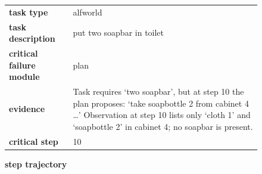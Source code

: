 \documentclass[../../main.tex]{subfiles}
\begin{document}
\begin{figure}[htbp]
\centering

\begin{tcolorbox}[
    title=\textbf{Error Type - Impossible Action},
    colback=orange!1!white,
    colframe=orange!50!black,
    fonttitle=\bfseries,
    enhanced jigsaw,
    breakable
]
\small

\begin{tabularx}{\linewidth}{@{}lX@{}}
\textbf{task type} & alfworld \\
\textbf{task description} & put two soapbar in toilet \\
\textbf{critical failure module} & plan \\
\textbf{evidence} & Task requires ‘two soapbar’, but at step 10 the plan proposes:
‘take soapbottle 2 from cabinet 4 …’ Observation at step 10 lists only
‘cloth 1’ and ‘soapbottle 2’ in cabinet 4; no soapbar is present. \\
\textbf{critical step} & 10 \\
\end{tabularx}

\medskip
\textbf{step trajectory}


\end{tcolorbox}
\end{figure}
\end{document}
